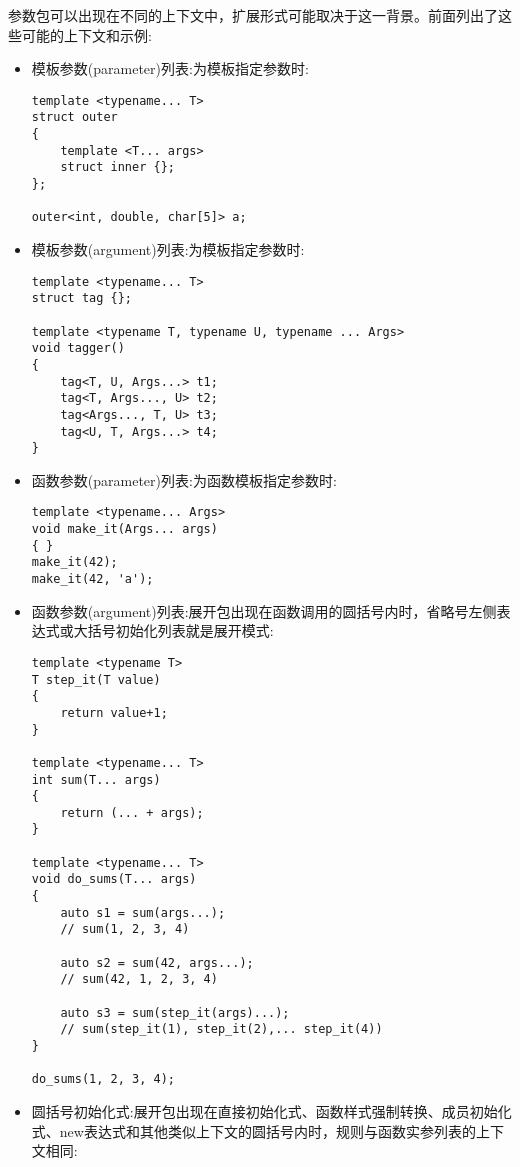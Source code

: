 参数包可以出现在不同的上下文中，扩展形式可能取决于这一背景。前面列出了这些可能的上下文和示例:

\begin{itemize}
\item
模板参数(parameter)列表:为模板指定参数时:

\begin{lstlisting}[style=styleCXX]
template <typename... T>
struct outer
{
	template <T... args>
	struct inner {};
};

outer<int, double, char[5]> a;
\end{lstlisting}

\item
模板参数(argument)列表:为模板指定参数时:

\begin{lstlisting}[style=styleCXX]
template <typename... T>
struct tag {};

template <typename T, typename U, typename ... Args>
void tagger()
{
	tag<T, U, Args...> t1;
	tag<T, Args..., U> t2;
	tag<Args..., T, U> t3;
	tag<U, T, Args...> t4;
}
\end{lstlisting}

\item
函数参数(parameter)列表:为函数模板指定参数时:

\begin{lstlisting}[style=styleCXX]
template <typename... Args>
void make_it(Args... args)
{ }
make_it(42);
make_it(42, 'a');
\end{lstlisting}

\item
函数参数(argument)列表:展开包出现在函数调用的圆括号内时，省略号左侧表达式或大括号初始化列表就是展开模式:

\begin{lstlisting}[style=styleCXX]
template <typename T>
T step_it(T value)
{
	return value+1;
}

template <typename... T>
int sum(T... args)
{
	return (... + args);
}

template <typename... T>
void do_sums(T... args)
{
	auto s1 = sum(args...);
	// sum(1, 2, 3, 4)
	
	auto s2 = sum(42, args...);
	// sum(42, 1, 2, 3, 4)
	
	auto s3 = sum(step_it(args)...);
	// sum(step_it(1), step_it(2),... step_it(4))
}

do_sums(1, 2, 3, 4);
\end{lstlisting}

\item
圆括号初始化式:展开包出现在直接初始化式、函数样式强制转换、成员初始化式、new表达式和其他类似上下文的圆括号内时，规则与函数实参列表的上下文相同:


\end{itemize}
